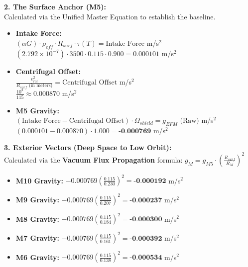 \documentclass[11pt, a4paper]{article}
\begin{document}
  \vspace{1.0em}
  \noindent \textbf{2. The Surface Anchor (M5):} \\
  \hspace*{1em} Calculated via the Unified Master Equation to establish the baseline.
  \begin{itemize}
    \item \textbf{Intake Force:} \\[0.5em]
    \hspace*{2em} $(\alpha G) \cdot \rho_{eff} \cdot R_{surf} \cdot \tau(T) = \text{Intake Force}$ m/s$^2$ \\[1em]
    \hspace*{2em} $(2.792 \times 10^{-7}) \cdot 3500 \cdot 0.115 \cdot 0.900 = 0.000101$ m/s$^2$
    
    \item \textbf{Centrifugal Offset:} \\[0.5em]
    \hspace*{2em} $\frac{v_{rot}^2}{R_{surf} \text{ (in meters)}} = \text{Centrifugal Offset}$ m/s$^2$ \\[1em]
    \hspace*{2em} $\frac{10^2}{115} \approx 0.000870$ m/s$^2$
    
    \item \textbf{M5 Gravity:} \\[0.5em]
    \hspace*{2em} $(\text{Intake Force} - \text{Centrifugal Offset}) \cdot \Omega_{shield} = g_{EFM} \text{ (Raw)}$ m/s$^2$ \\[1em]
    \hspace*{2em} $(0.000101 - 0.000870) \cdot 1.000 = \textbf{-0.000769}$ m/s$^2$
  \end{itemize}

  \clearpage
  \noindent \textbf{3. Exterior Vectors (Deep Space to Low Orbit):} \\
  \hspace*{1em} Calculated via the \textbf{Vacuum Flux Propagation} formula: $g_M = g_{M5} \cdot \left( \frac{R_{surf}}{R_M} \right)^2$
  \begin{itemize}
    \item \textbf{M10 Gravity:} $-0.000769 \left( \frac{0.115}{0.230} \right)^2 = \textbf{-0.000192}$ m/s$^2$
    \item \textbf{M9 Gravity:} $-0.000769 \left( \frac{0.115}{0.207} \right)^2 = \textbf{-0.000237}$ m/s$^2$
    \item \textbf{M8 Gravity:} $-0.000769 \left( \frac{0.115}{0.184} \right)^2 = \textbf{-0.000300}$ m/s$^2$
    \item \textbf{M7 Gravity:} $-0.000769 \left( \frac{0.115}{0.161} \right)^2 = \textbf{-0.000392}$ m/s$^2$
    \item \textbf{M6 Gravity:} $-0.000769 \left( \frac{0.115}{0.138} \right)^2 = \textbf{-0.000534}$ m/s$^2$
  \end{itemize}
\end{document}
